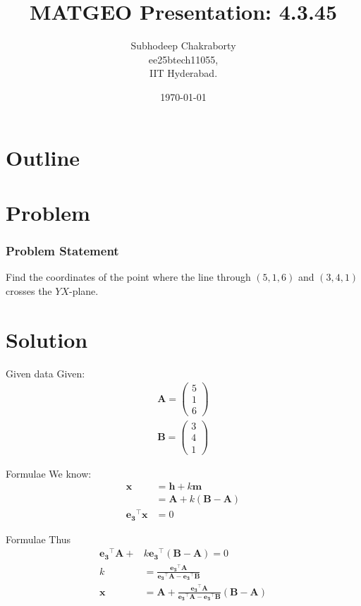 \documentclass{beamer}
\title{MATGEO Presentation: 4.3.45}
\author{Subhodeep Chakraborty \\ ee25btech11055,\\IIT Hyderabad.}
\date{\today}
\providecommand{\brak}[1]{\ensuremath{\left(#1\right)}}
\theoremstyle{remark}
\newcommand{\myvec}[1]{\ensuremath{\begin{pmatrix}#1\end{pmatrix}}}
\let\vec\mathbf
\numberwithin{equation}{section}
\begin{document}
\begin{frame}
\titlepage
\end{frame}

\section*{Outline}
\begin{frame}
\tableofcontents
\end{frame}

\section{Problem}
\begin{frame}
\frametitle{Problem Statement}

Find the coordinates of the point where the line through \brak{5, 1, 6} and \brak{3, 4, 1} crosses the $YX$-plane.

\end{frame}

\section{Solution}
\begin{frame}{Given data}
Given:
\begin{align}
 \vec{A} = \myvec{5\\1\\6} \\
 \vec{B} = \myvec{3\\4\\1}
\end{align}
\end{frame}

\begin{frame}{Formulae}
We know:
\begin{align}
 \vec{x} &= \vec{h} +k\vec{m} \\
 &= \vec{A} + k\brak{\vec{B-A}} \\
 \vec{e_3}^\top\vec{x} &= 0
\end{align}
\end{frame}

\begin{frame}{Formulae}
Thus
\begin{align}
 \vec{e_3}^\top\vec{A} + &k\vec{e_3}^\top\brak{\vec{B-A}} = 0 \\
 k &= \frac{\vec{e_3}^\top\vec{A}}{\vec{e_3}^\top\vec{A}-\vec{e_3}^\top\vec{B}} \\
 \vec{x} &= \vec{A} + \frac{\vec{e_3}^\top\vec{A}}{\vec{e_3}^\top\vec{A}-\vec{e_3}^\top\vec{B}}\brak{\vec{B-A}}
\end{align}
\end{frame}
\end{document}
